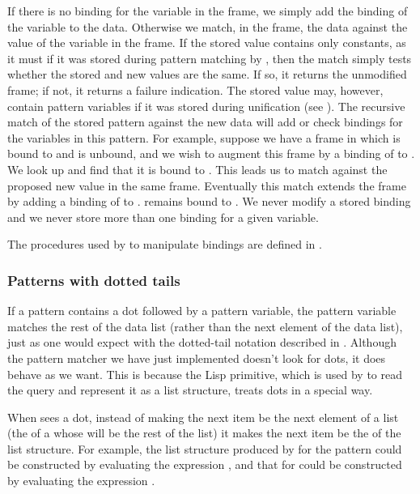 If there is no binding for the variable in the frame, we simply add the binding of the variable to the data.
Otherwise we match, in the frame, the data against the value of the variable in the frame.
If the stored value contains only constants, as it must if it was stored during pattern matching by , then the match simply tests whether the stored and new values are the same.
If so, it returns the unmodified frame;
if not, it returns a failure indication.
The stored value may, however, contain pattern variables if it was stored during unification (see ).
The recursive match of the stored pattern against the new data will add or check bindings for the variables in this pattern.
For example, suppose we have a frame in which  is bound to  and  is unbound, and we wish to augment this frame by a binding of  to .
We look up  and find that it is bound to .
This leads us to match  against the proposed new value  in the same frame.
Eventually this match extends the frame by adding a binding of  to .
 remains bound to .
We never modify a stored binding and we never store more than one binding for a given variable.

The procedures used by  to manipulate bindings are defined in .



\subsubsection*{Patterns with dotted tails}

If a pattern contains a dot followed by a pattern variable, the pattern variable matches the rest of the data list (rather than the next element of the data list), just as one would expect with the dotted-tail notation described in .
Although the pattern matcher we have just implemented doesn’t look for dots, it does behave as we want.
This is because the Lisp  primitive, which is used by  to read the query and represent it as a list structure, treats dots in a special way.

When  sees a dot, instead of making the next item be the next element of a list (the  of a  whose  will be the rest of the list) it makes the next item be the  of the list structure.
For example, the list structure produced by  for the pattern  could be constructed by evaluating the expression , and that for  could be constructed by evaluating the expression .

